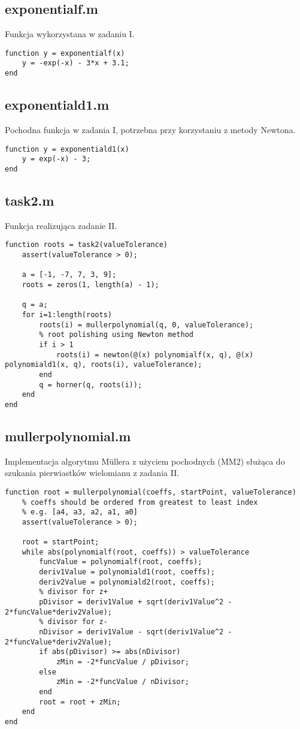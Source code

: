 \documentclass[12pt]{article}
\begin{document}
\subsection{exponentialf.m}
Funkcja wykorzystana w zadaniu I.
\begin{verbatim}
function y = exponentialf(x)
    y = -exp(-x) - 3*x + 3.1;
end
\end{verbatim}

\subsection{exponentiald1.m}
Pochodna funkcja w zadania I, potrzebna przy korzystaniu z metody Newtona.
\begin{verbatim}
function y = exponentiald1(x)
    y = exp(-x) - 3;
end
\end{verbatim}

\subsection{task2.m}
Funkcja realizująca zadanie II.
\begin{verbatim}
function roots = task2(valueTolerance)
    assert(valueTolerance > 0);

    a = [-1, -7, 7, 3, 9];
    roots = zeros(1, length(a) - 1);

    q = a;
    for i=1:length(roots)
        roots(i) = mullerpolynomial(q, 0, valueTolerance);
        % root polishing using Newton method
        if i > 1
            roots(i) = newton(@(x) polynomialf(x, q), @(x) polynomiald1(x, q), roots(i), valueTolerance);
        end
        q = horner(q, roots(i));
    end
end
\end{verbatim}

\subsection{mullerpolynomial.m}
Implementacja algorytmu Müllera z użyciem pochodnych (MM2) służąca do szukania pierwiastków wielomianu z zadania II.
\begin{verbatim}
function root = mullerpolynomial(coeffs, startPoint, valueTolerance)
    % coeffs should be ordered from greatest to least index
    % e.g. [a4, a3, a2, a1, a0]
    assert(valueTolerance > 0);

    root = startPoint;
    while abs(polynomialf(root, coeffs)) > valueTolerance
        funcValue = polynomialf(root, coeffs);
        deriv1Value = polynomiald1(root, coeffs);
        deriv2Value = polynomiald2(root, coeffs);
        % divisor for z+
        pDivisor = deriv1Value + sqrt(deriv1Value^2 - 2*funcValue*deriv2Value);
        % divisor for z-
        nDivisor = deriv1Value - sqrt(deriv1Value^2 - 2*funcValue*deriv2Value);
        if abs(pDivisor) >= abs(nDivisor)
            zMin = -2*funcValue / pDivisor;
        else
            zMin = -2*funcValue / nDivisor;
        end
        root = root + zMin;
    end
end
\end{verbatim}
\end{document}
